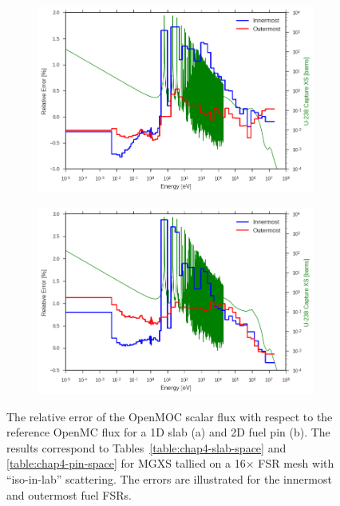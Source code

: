 \begin{figure}[H]
\begin{subfigure}{.5\textwidth}
  \centering
  \includegraphics[width=\linewidth]{figures/biases/slab/rel-err-inner-outer}
  \caption{}
\end{subfigure}
\begin{subfigure}{.5\textwidth}
  \centering
  \includegraphics[width=\linewidth]{figures/biases/pin-cell/rel-err-inner-outer}
  \caption{}
\end{subfigure}
\caption[Flux relative error by energy group]{The relative error of the OpenMOC scalar flux with respect to the reference OpenMC flux for a 1D slab (a) and 2D fuel pin (b). The results correspond to Tables~\ref{table:chap4-slab-space} and \ref{table:chap4-pin-space} for \ac{MGXS} tallied on a 16$\times$ \ac{FSR} mesh with ``iso-in-lab'' scattering. The errors are illustrated for the innermost and outermost fuel \ac{FSR}s.}
\label{fig:chap4-slab-flux}
\end{figure}

